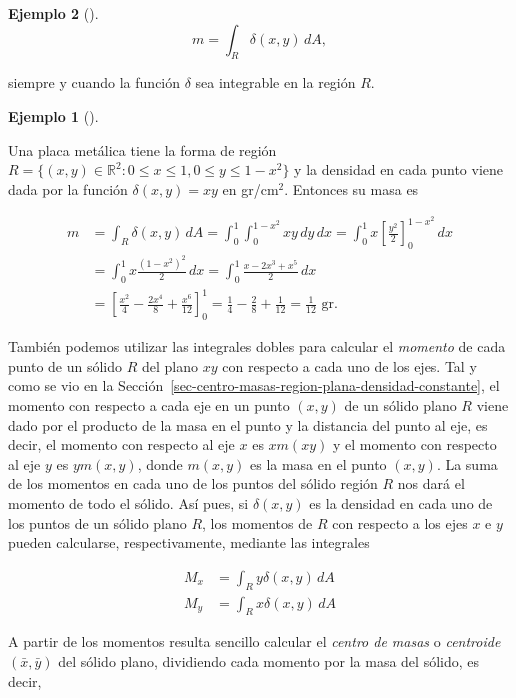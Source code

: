 \documentclass[
  a4paper,
]{scrreport}
\theoremstyle{definition}
\newtheorem{example}{Ejemplo}[chapter]
\theoremstyle{plain}
\theoremstyle{definition}
\theoremstyle{definition}
\theoremstyle{plain}
\theoremstyle{plain}
\theoremstyle{remark}
\begin{document}
\begin{example}[]
\[
m = \int_R \delta(x,y)\,dA,
\]

siempre y cuando la función \(\delta\) sea integrable en la región
\(R\).

\begin{example}[]\protect\hypertarget{exm-masa-region-plana}{}\label{exm-masa-region-plana}

Una placa metálica tiene la forma de región
\(R=\{(x,y)\in\mathbb{R}^2: 0\leq x\leq 1, 0\leq y\leq 1-x^2\}\) y la
densidad en cada punto viene dada por la función \(\delta(x,y)=xy\) en
gr/cm\(^2\). Entonces su masa es

\begin{align*}
m 
&= \int_R \delta(x,y)\,dA
= \int_0^1 \int_0^{1-x^2} xy\,dy\,dx
= \int_0^1 x\left[\frac{y^2}{2}\right]_0^{1-x^2}\,dx \\
&= \int_0^1 x\frac{(1-x^2)^2}{2}\,dx 
= \int_0^1 \frac{x-2x^3+x^5}{2}\,dx \\
&= \left[\frac{x^2}{4}-\frac{2x^4}{8}+\frac{x^6}{12}\right]_0^1
= \frac{1}{4}-\frac{2}{8}+\frac{1}{12}
= \frac{1}{12} \mbox{ gr}.
\end{align*}

\end{example}

También podemos utilizar las integrales dobles para calcular el
\emph{momento} de cada punto de un sólido \(R\) del plano \(xy\) con
respecto a cada uno de los ejes. Tal y como se vio en la
Sección~\ref{sec-centro-masas-region-plana-densidad-constante}, el
momento con respecto a cada eje en un punto \((x,y)\) de un sólido plano
\(R\) viene dado por el producto de la masa en el punto y la distancia
del punto al eje, es decir, el momento con respecto al eje \(x\) es
\(xm(xy)\) y el momento con respecto al eje \(y\) es \(ym(x,y)\), donde
\(m(x,y)\) es la masa en el punto \((x,y)\). La suma de los momentos en
cada uno de los puntos del sólido región \(R\) nos dará el momento de
todo el sólido. Así pues, si \(\delta(x,y)\) es la densidad en cada uno
de los puntos de un sólido plano \(R\), los momentos de \(R\) con
respecto a los ejes \(x\) e \(y\) pueden calcularse, respectivamente,
mediante las integrales

\begin{align*}
M_x 
&= \int_R y\delta(x,y)\,dA \\
M_y 
&= \int_R x\delta(x,y)\,dA
\end{align*}

A partir de los momentos resulta sencillo calcular el \emph{centro de
masas} o \emph{centroide} \((\bar x, \bar y)\) del sólido plano,
dividiendo cada momento por la masa del sólido, es decir,


\end{example}
\end{document}
